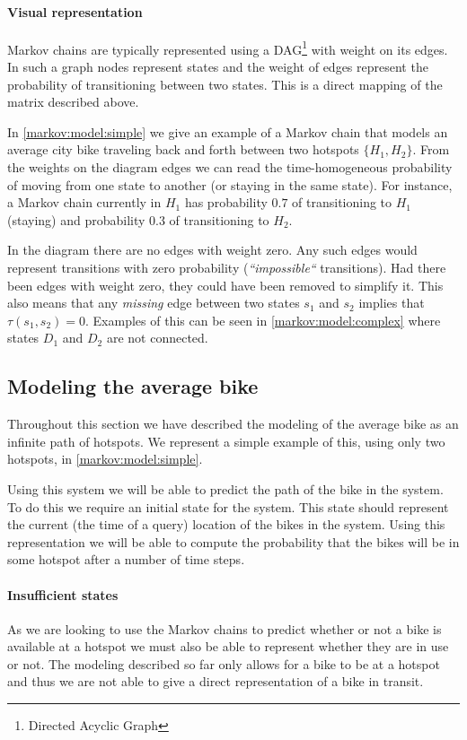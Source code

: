 \paragraph{Visual representation}
Markov chains are typically represented using a DAG\footnote{Directed Acyclic Graph} with weight on its edges.
In such a graph nodes represent states and the weight of edges represent the probability of transitioning between two states.
This is a direct mapping of the matrix described above.

In \cref{markov:model:simple} we give an example of a Markov chain that models an average city bike traveling back and forth between two hotspots $\{H_1, H_2\}$.
From the weights on the diagram edges we can read the time-homogeneous probability of moving from one state to another (or staying in the same state).
For instance, a Markov chain currently in $H_1$ has probability $0.7$ of transitioning to $H_1$ (staying) and probability $0.3$ of transitioning to $H_2$.

In the diagram there are no edges with weight zero.
Any such edges would represent transitions with zero probability (\textit{``impossible``} transitions).
Had there been edges with weight zero, they could have been removed to simplify it.
This also means that any \textit{missing} edge between two states $s_1$ and $s_2$ implies that $\tau(s_1, s_2) = 0$.
Examples of this can be seen in \cref{markov:model:complex} where states $D_1$ and $D_2$ are not connected.

\subsection{Modeling the average bike}\label{markov:modeling}
Throughout this section we have described the modeling of the average bike as an infinite path of hotspots.
We represent a simple example of this, using only two hotspots, in \cref{markov:model:simple}.

Using this system we will be able to predict the path of the bike in the system.
To do this we require an initial state for the system.
This state should represent the current (the time of a query) location of the bikes in the system.
Using this representation we will be able to compute the probability that the bikes will be in some hotspot after a number of time steps.

\paragraph{Insufficient states}
As we are looking to use the Markov chains to predict whether or not a bike is available at a hotspot we must also be able to represent whether they are in use or not.
The modeling described so far only allows for a bike to be at a hotspot and thus we are not able to give a direct representation of a bike in transit.

